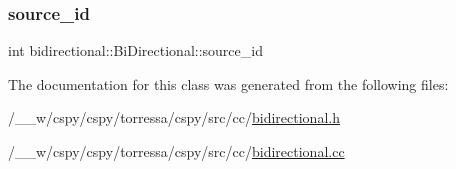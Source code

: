 \subsubsection{\texorpdfstring{source\+\_\+id}{source\_id}}
{\footnotesize\ttfamily int bidirectional\+::\+Bi\+Directional\+::source\+\_\+id}



The documentation for this class was generated from the following files\+:\begin{DoxyCompactItemize}
\item 
/\+\_\+\+\_\+w/cspy/cspy/torressa/cspy/src/cc/\hyperlink{bidirectional_8h}{bidirectional.\+h}\item 
/\+\_\+\+\_\+w/cspy/cspy/torressa/cspy/src/cc/\hyperlink{bidirectional_8cc}{bidirectional.\+cc}\end{DoxyCompactItemize}
